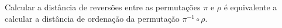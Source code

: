 
\begin{prop}
Calcular a distância de reversões entre as permutações $\pi$ e $\rho$ é equivalente a calcular a distância de ordenação da permutação $\pi^{-1} \circ \rho$.
\end{prop}
